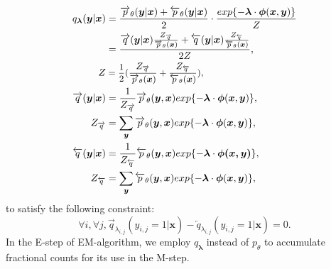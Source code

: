 \documentclass[english]{jnlp_1.4}
\begin{document}
\begin{equation}
 \label{eqn:agreqn}
\begin{aligned}[t]
 q_{\boldsymbol{\lambda}}(\boldsymbol{y}|\boldsymbol{x}) & =  
	\frac{\overrightarrow{p}_{\theta}(\boldsymbol{y}|\boldsymbol{x}) + \overleftarrow{p}_{\theta}(\boldsymbol{y}|\boldsymbol{x})}{2} \cdot
	\frac{exp\{- \boldsymbol{\lambda} \cdot \boldsymbol{\phi}(\boldsymbol{x},\boldsymbol{y}) \}}{Z} \\
 &  = \frac{
	\overrightarrow{q}(\boldsymbol{y}|\boldsymbol{x})
	\frac{Z_{\overrightarrow{q}}}{\overrightarrow{p}_{\theta} (\boldsymbol{x})} + 
	\overleftarrow{q}(\boldsymbol{y}|\boldsymbol{x})
	\frac{Z_{\overleftarrow{q}}}{\overleftarrow{p}_{\theta} (\boldsymbol{x})}}{2Z}, \\
 Z & = \small \frac{1}{2}(\frac{Z_{\overrightarrow{q}}}{\overrightarrow{p}_{\theta}(\boldsymbol{x})} 
	+ \frac{Z_{\overleftarrow{q}}}{\overleftarrow{p}_{\theta}(\boldsymbol{x})}), \\ 
	
\overrightarrow{q}(\boldsymbol{y}|\boldsymbol{x}) & =  
	\frac{1}{Z_{\overrightarrow{q}}}\overrightarrow{p}_{\theta}(\boldsymbol{y},\boldsymbol{x})exp\{- \boldsymbol{\lambda} 
	\cdot \boldsymbol{\phi}(\boldsymbol{x},\boldsymbol{y}) \}, \\ 
 Z_{\overrightarrow{q}} & = \sum_{\boldsymbol{y}}\overrightarrow{p}_{\theta}(\boldsymbol{y},\boldsymbol{x})exp\{- \boldsymbol{\lambda} 
	\cdot \boldsymbol{\phi}(\boldsymbol{x},\boldsymbol{y})\}, \\
 \overleftarrow{q}(\boldsymbol{y}|\boldsymbol{x}) & = 
	 \frac{1}{Z_{\overleftarrow{q}}}\overleftarrow{p}_{\theta}(\boldsymbol{y},\boldsymbol{x})exp\{- \boldsymbol{\lambda} 
	\cdot \boldsymbol{\phi(\boldsymbol{x},\boldsymbol{y})} \}, \\
 Z_{\overleftarrow{q}} & = \sum_{\boldsymbol{y}}\overleftarrow{p}_{\theta}(\boldsymbol{y},\boldsymbol{x})exp\{- \boldsymbol{\lambda} 
	\cdot \boldsymbol{\phi}(\boldsymbol{x},\boldsymbol{y})\},
\end{aligned}
\end{equation}
to satisfy the following constraint:
\begin{equation}
\label{eq:constraint}
\forall i, \forall j, \overrightarrow{q}_{\lambda_{i,j}}(y_{i,j} \!\! = \!\! 1|\boldsymbol{x}) - \overleftarrow{q}_{\lambda_{i,j}}(y_{i,j} \!\! = \!\! 1|\boldsymbol{x}) = 0.
\end{equation}
In the E-step of EM-algorithm, we employ $q_{\boldsymbol{\lambda}}$ instead of $p_{\theta}$ to accumulate fractional counts for its use in the M-step.
\end{document}
